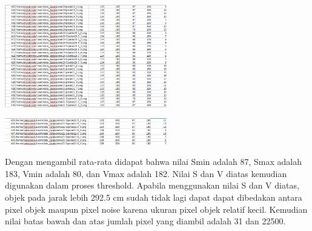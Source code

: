 \documentclass[10pt,journal,compsoc]{IEEEtran}
\begin{document}
  \begin{center}
    \includegraphics[width=200pt]{data_jarak14}
  \end{center}
  \begin{center}
    \includegraphics[width=200pt]{data_jarak15}
  \end{center}
  Dengan mengambil rata-rata didapat bahwa nilai Smin adalah 87, Smax adalah 183, Vmin adalah 80, dan Vmax adalah 182.
  Nilai S dan V diatas kemudian digunakan dalam proses threshold.
  Apabila menggunakan nilai S dan V diatas, objek pada jarak lebih 292.5 cm sudah tidak lagi dapat dapat dibedakan antara pixel objek maupun pixel noise karena ukuran pixel objek relatif kecil.
  Kemudian nilai batas bawah dan atas jumlah pixel yang diambil adalah 31 dan 22500.
  
\end{document}
